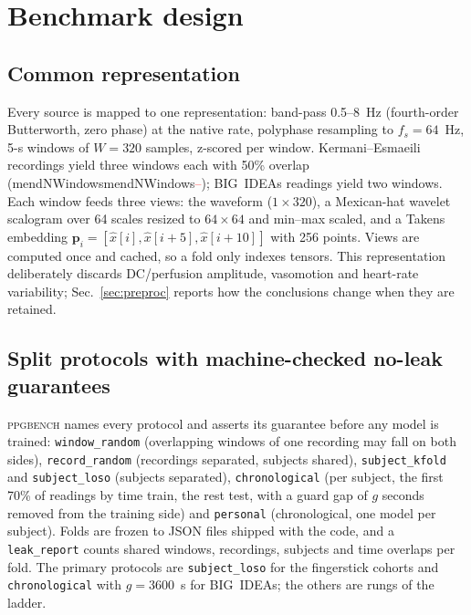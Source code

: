 \documentclass[journal]{IEEEtran}
\newcommand{\m}[1]{\ifcsname #1\endcsname\csname #1\endcsname\else\textcolor{red}{--}\fi}
\begin{document}
\section{Benchmark design}
\label{sec:bench}

\subsection{Common representation}
Every source is mapped to one representation: band-pass 0.5--8~Hz
(fourth-order Butterworth, zero phase) at the native rate, polyphase
resampling to $f_s=64$~Hz, 5-s windows of $W=320$ samples, z-scored per
window.  Kermani--Esmaeili recordings yield three windows each with 50\%
overlap (\m{mendNWindows}); BIG~IDEAs readings yield two windows.  Each window
feeds three views: the waveform ($1\times320$), a Mexican-hat wavelet
scalogram over 64 scales resized to $64\times64$ and min--max scaled, and a
Takens embedding $\mathbf{p}_i=[\hat{x}[i],\hat{x}[i+5],\hat{x}[i+10]]$
with 256 points.  Views are computed once and cached, so a fold only indexes
tensors.  This representation deliberately discards DC/perfusion amplitude,
vasomotion and heart-rate variability; Sec.~\ref{sec:preproc} reports how
the conclusions change when they are retained.

\subsection{Split protocols with machine-checked no-leak guarantees}
\label{sec:protocols}
\textsc{ppgbench} names every protocol and asserts its guarantee before any
model is trained: \texttt{window\_random} (overlapping windows of one
recording may fall on both sides), \texttt{record\_random} (recordings
separated, subjects shared), \texttt{subject\_kfold} and
\texttt{subject\_loso} (subjects separated), \texttt{chronological} (per
subject, the first 70\% of readings by time train, the rest test, with a
guard gap of $g$ seconds removed from the training side) and
\texttt{personal} (chronological, one model per subject).  Folds are frozen
to JSON files shipped with the code, and a \texttt{leak\_report} counts
shared windows, recordings, subjects and time overlaps per fold.  The
primary protocols are \texttt{subject\_loso} for the fingerstick cohorts
and \texttt{chronological} with $g=3600$~s for BIG~IDEAs; the others are
rungs of the ladder.
\end{document}

